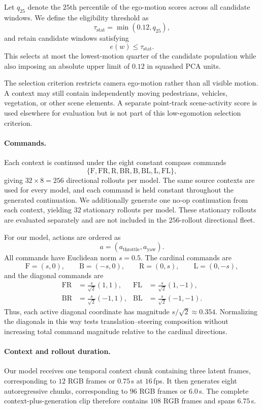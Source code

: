 Let $q_{25}$ denote the $25$th percentile of the ego-motion scores across all
candidate windows. We define the eligibility threshold as
\[
\tau_{\mathrm{stat}}
=
\min(0.12,q_{25}),
\]
and retain candidate windows satisfying
\[
e(w)\leq\tau_{\mathrm{stat}}.
\]
This selects at most the lowest-motion quarter of the candidate population
while also imposing an absolute upper limit of $0.12$ in squashed PCA units.

The selection criterion restricts camera ego-motion rather than all visible
motion. A context may still contain independently moving pedestrians,
vehicles, vegetation, or other scene elements. A separate point-track
scene-activity score is used elsewhere for evaluation but is not part of
this low-egomotion selection criterion.

\paragraph{Commands.}
Each context is continued under the eight constant compass commands
\[
\{
\mathrm{F},\mathrm{FR},\mathrm{R},\mathrm{BR},
\mathrm{B},\mathrm{BL},\mathrm{L},\mathrm{FL}
\},
\]
giving $32\times8=256$ directional rollouts per model. The same source
contexts are used for every model, and each command is held constant throughout
the generated continuation. We additionally generate one no-op continuation
from each context, yielding $32$ stationary rollouts per model. These stationary
rollouts are evaluated separately and are not included in the $256$-rollout
directional fleet.

For our model, actions are ordered as
\[
a=(a_{\mathrm{throttle}},a_{\mathrm{yaw}}).
\]
All commands have Euclidean norm $s=0.5$. The cardinal commands are
\[
\mathrm{F}=(s,0),\qquad
\mathrm{B}=(-s,0),\qquad
\mathrm{R}=(0,s),\qquad
\mathrm{L}=(0,-s),
\]
and the diagonal commands are
\[
\begin{aligned}
\mathrm{FR}&=\frac{s}{\sqrt{2}}(1,1),&
\mathrm{FL}&=\frac{s}{\sqrt{2}}(1,-1),\\
\mathrm{BR}&=\frac{s}{\sqrt{2}}(-1,1),&
\mathrm{BL}&=\frac{s}{\sqrt{2}}(-1,-1).
\end{aligned}
\]
Thus, each active diagonal coordinate has magnitude
$s/\sqrt{2}\approx0.354$. Normalizing the diagonals in this way tests
translation--steering composition without increasing total command magnitude
relative to the cardinal directions.

\paragraph{Context and rollout duration.}
Our model receives one temporal context chunk containing three latent frames,
corresponding to $12$ RGB frames or $0.75$\,s at $16$\,fps. It then generates
eight autoregressive chunks, corresponding to $96$ RGB frames or $6.0$\,s.
The complete context-plus-generation clip therefore contains $108$ RGB frames
and spans $6.75$\,s.

